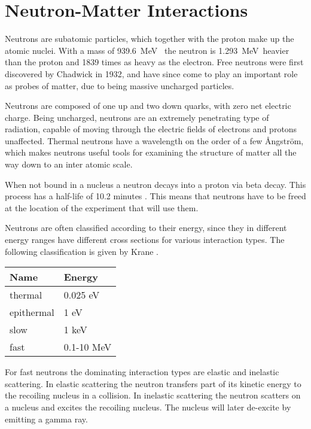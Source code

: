 \documentclass[main.tex]{subfiles}
\begin{document}
\section{Neutron-Matter Interactions}\label{sec:neutronMatterInteractions}
Neutrons are subatomic particles, which together with the proton make up the atomic nuclei. With a mass of \SI{939.6}{\MeV\;} the neutron is \SI{1.293}{\MeV\;}heavier than the proton and 1839 times as heavy as the electron. Free neutrons were first discovered by Chadwick in 1932, and have since come to play an important role as probes of matter, due to being massive uncharged particles.

Neutrons are composed of one up and two down quarks, with zero net electric charge. Being uncharged, neutrons are an extremely penetrating type of radiation, capable of moving through the electric fields of electrons and protons unaffected. Thermal neutrons have a wavelength on the order of a few Ångström, which makes neutrons useful tools for examining the structure of matter all the way down to an inter atomic scale.

When not bound in a nucleus a neutron decays into a proton via beta decay. This process has a half-life of 10.2 minutes \cite{Nudat}. This means that neutrons have to be freed at the location of the experiment that will use them.


Neutrons are often classified according to their energy, since they in different energy ranges have different cross sections for various interaction types. The following classification is given by Krane \cite{Krane}.

\begin{table}[h]
\center
\begin{tabular}{|l|l|}
\hline
\textbf{Name} & \textbf{Energy} \\ \hline
thermal       & 0.025 eV        \\ \hline
epithermal    & 1 eV            \\ \hline
slow          & 1 keV           \\ \hline
fast          & 0.1-10 MeV      \\ \hline
\end{tabular}
\label{tab:neutron}
\end{table}

For fast neutrons the dominating interaction types are elastic and inelastic scattering. In elastic scattering the neutron transfers part of its kinetic energy to the recoiling nucleus \cite{Leo} in a collision. In inelastic scattering the neutron scatters on a nucleus and excites the recoiling nucleus. The nucleus will later de-excite by emitting a gamma ray. 
\end{document}
